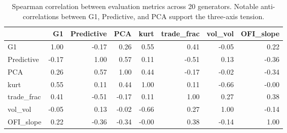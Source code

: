 \begin{table}
\caption{Spearman correlation between evaluation metrics across 20 generators. Notable anti-correlations between G1, Predictive, and PCA support the three-axis tension.}
\label{tab:metric_correlations}
\begin{tabular}{lrrrrrrr}
\toprule
 & G1 & Predictive & PCA & kurt & trade_frac & vol_vol & OFI_slope \\
\midrule
G1 & 1.00 & -0.17 & 0.26 & 0.55 & 0.41 & -0.05 & 0.22 \\
Predictive & -0.17 & 1.00 & 0.57 & 0.11 & -0.51 & 0.13 & -0.36 \\
PCA & 0.26 & 0.57 & 1.00 & 0.44 & -0.17 & -0.02 & -0.34 \\
kurt & 0.55 & 0.11 & 0.44 & 1.00 & 0.11 & -0.66 & -0.00 \\
trade_frac & 0.41 & -0.51 & -0.17 & 0.11 & 1.00 & 0.27 & 0.38 \\
vol_vol & -0.05 & 0.13 & -0.02 & -0.66 & 0.27 & 1.00 & -0.14 \\
OFI_slope & 0.22 & -0.36 & -0.34 & -0.00 & 0.38 & -0.14 & 1.00 \\
\bottomrule
\end{tabular}
\end{table}
